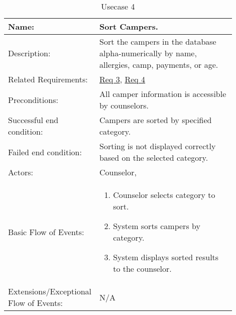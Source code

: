 \documentclass[11pt]{article}
\begin{document}
\begin{table}[!htb]
\caption{Usecase 4}
\label{des:sort campers}
\begin{center}
\begin{tabular}{p{0.30\linewidth}p{0.60\linewidth}}
	Name: & Sort Campers.\\\hline
	Description: & Sort the campers in the database alpha-numerically by name, allergies, camp, payments, or age.\\\hline
	Related Requirements:& \hyperlink{Req3}{Req 3}, \hyperlink{Req4}{Req 4}\\\hline
	Preconditions:& All camper information is accessible by counselors.\\\hline
	Successful end condition:& Campers are sorted by specified category.\\\hline
	Failed end condition:& Sorting is not displayed correctly based on the selected category.\\\hline
	Actors:& Counselor,\\\hline
	Basic Flow of Events: & \begin{enumerate}[topsep=0pt]
		\item Counselor selects category to sort.
		\item System sorts campers by category.
		\item System displays sorted results to the counselor.
	\end{enumerate}\\\hline
	Extensions/Exceptional Flow of Events: & \vspace*{.25em}  N/A
\end{tabular}
\end{center}
\end{table}

\end{document}
